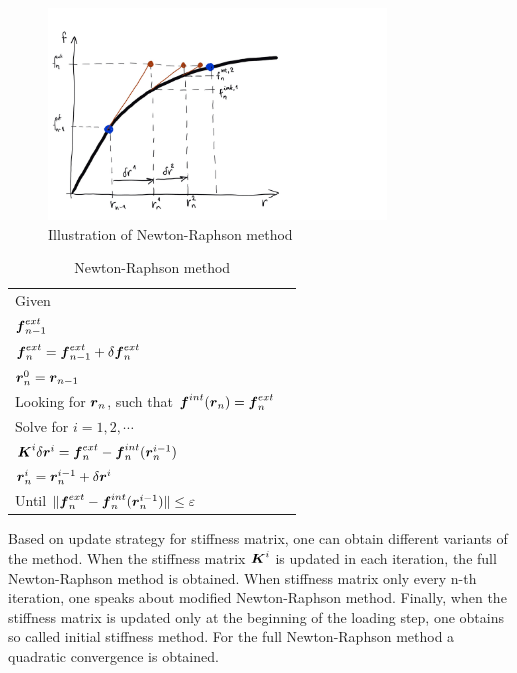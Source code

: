 \begin{figure}
  \begin{center}
    \includegraphics[width=0.8\textwidth]{figs/newtonraphson.png}
  \end{center}
  \label{fig:newtonraphson}
  \caption{Illustration of Newton-Raphson method}
\end{figure}


\begin{table}[h!]
  \begin{center}
  \begin{tabular}{|l|l|}
    \hline
    Given \\
    \;\;$\mbox{\boldmath$f$}^{ext}_{n-1}$\\
    \;\;$\mbox{\boldmath$f$}^{ext}_{n}=\mbox{\boldmath$f$}^{ext}_{n-1}+\delta\mbox{\boldmath$f$}^{ext}_n$\\
    \;\;$\mbox{\boldmath$r$}^{0}_{n} = \mbox{\boldmath$r$}_{n-1}$\\
    Looking for $\mbox{\boldmath$r$}_n$, such that $\mbox{\boldmath$f$}^{int}(\mbox{\boldmath$r$}_n) = \mbox{\boldmath$f$}^{ext}_n$\\
    Solve for $i=1,2,\cdots$\\ 
    \;\;$\mbox{\boldmath$K$}^{i}\delta\mbox{\boldmath$r$}^{i} = \mbox{\boldmath$f$}^{ext}_n-\mbox{\boldmath$f$}^{int}_n(\mbox{\boldmath$r$}^{i-1}_{n})$\\
    \;\;$\mbox{\boldmath$r$}^i_{n} = \mbox{\boldmath$r$}^{i-1}_{n}+\delta\mbox{\boldmath$r$}^i$\\
    Until $\|\mbox{\boldmath$f$}^{ext}_n-\mbox{\boldmath$f$}^{int}_n(\mbox{\boldmath$r$}^{i-1}_{n})\| \le \varepsilon$\\
    \hline
  \end{tabular}
  \end{center}
  \caption{Newton-Raphson method}
  \label{tab:newtonraphson}
\end{table}

Based on update strategy for stiffness matrix, one can obtain different variants of the method. 
When the stiffness matrix $\mbox{\boldmath$K$}^{i}$ is updated in each iteration, the full Newton-Raphson method is obtained. When stiffness matrix only every n-th iteration, one speaks about modified Newton-Raphson method. Finally, when the stiffness matrix is updated only at the beginning of the loading step, one obtains so called initial stiffness method.
For the full Newton-Raphson method a quadratic convergence is obtained.

